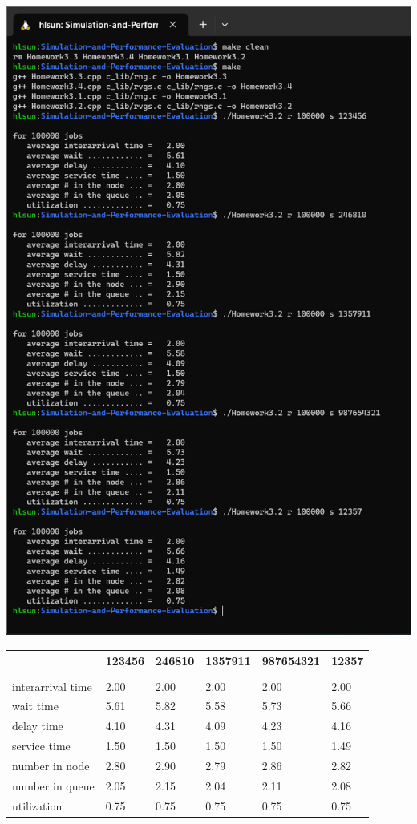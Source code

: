 \newpage
\vspace{35pt}
\begin{center}
    \includegraphics[scale=0.75]{Sections/Q2/H3_2.png}
\end{center}
\newpage
\begin{table}[h]
\centering
\begin{tabular}{l|lllll}
                  & 123456 & 246810 & 1357911 & 987654321 & 12357 \\
                  \hline\\
interarrival time & 2.00   & 2.00   & 2.00    & 2.00      & 2.00  \\
wait time         & 5.61   & 5.82   & 5.58    & 5.73      & 5.66  \\
delay time        & 4.10   & 4.31   & 4.09    & 4.23      & 4.16  \\
service time      & 1.50   & 1.50   & 1.50    & 1.50      & 1.49  \\
number in node    & 2.80   & 2.90   & 2.79    & 2.86      & 2.82  \\
number in queue   & 2.05   & 2.15   & 2.04    & 2.11      & 2.08  \\
utilization       & 0.75   & 0.75   & 0.75    & 0.75      & 0.75 
\end{tabular}
\end{table}
